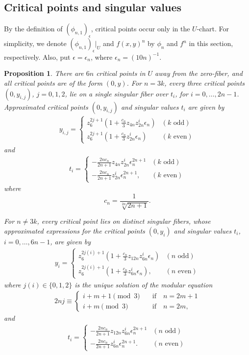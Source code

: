 \documentclass[10pt,a4paper,reqno]{amsart}
\newtheorem{prop}[thm]{Proposition}
\theoremstyle{definition}
\numberwithin{equation}{section}
\numberwithin{figure}{section}
\newcommand{\ep}{\epsilon}
\begin{document}
\subsection{Critical points and singular values} \label{sec:crit,sing}
By the definition of $(\phi_{n,1})_{\ep}$, critical points occur only in the $U$-chart.
For simplicity, we denote $(\phi_{n,1})_{\ep} |_U$ and $f(x,y)^n$ by $\phi_n$ and $f^n$ in this section, respectively.
Also, put $\ep=\ep_n$, where $\ep_n=(10n)^{-1}$.		 
\begin{prop}
There are $6n$ critical points in $U$ away from the zero-fiber, and all critical points are of the form $(0,y)$.
For $n=3k$, every three critical points $(0,y_{i,j})$, $j=0,1,2$, lie on a single singular fiber over $t_i$, for $i=0,\dots, 2n-1$.
Approximated critical points $(0,y_{i,j})$ and singular values $t_i$ are given by
\begin{align}\label{eq:y_i,j, 1}
y_{i,j}=
\begin{cases} z_6^{2j+1} (1+\frac{c_n}{3} z_{4n} z_{2n}^i {\ep_n}) & (k \text{ odd}) \\ 
z_6^{2j+1} (1+\frac{c_n}{3} z_{2n}^i {\ep_n}) & (k \text{ even})
\end{cases}
\end{align}
and
\begin{align} \label{eq:t_i, 1}
t_{i}=
\begin{cases} - \frac{2nc_n}{2n+1}  z_{4n}z_{2n}^i {\ep_n^{2n+1}} & (k \text{ odd})\\  
-\frac{2nc_n}{2n+1}  z_{2n}^i {\ep_n^{2n+1}}, & (k \text{ even})
\end{cases} 
\end{align}
where \[c_n=\frac1{\sqrt[2n]{2n+1}}.\]

For $n \neq 3k$, every critical point lies on distinct singular fibers, whose approximated expressions for the critical points
$(0,y_i)$ and singular values $t_i$, $i=0,\dots, 6n-1$, are given by
\begin{align}
y_i=
\begin{cases}
z_6^{2j(i)+1}(1+\frac{c_n}{3} z_{12n} z_{6n}^i \ep_n )& (n \text{ odd}) \\
z_6^{2j(i)+1}(1+\frac{c_n}{3} z_{6n}^i \ep_n), & (n \text{ even}) 
\end{cases}
\end{align}
where $j(i)\in\{0,1,2\}$ is the unique solution of the modular equation
\begin{align} 
2nj \equiv \begin{cases} i+m+1 \pmod 3 & \quad \text{if}  \quad n=2m+1\\
 i+m \pmod 3 & \quad \text{if}  \quad n=2m, \end{cases}
\end{align}
and
\begin{align}\label{eq:t_i, 2}
t_{i}=\begin{cases} - \frac{2nc_n}{2n+1}  z_{12n}z_{6n}^i {\ep_n^{2n+1}} & (n \text{ odd})\\ 
 -\frac{2nc_n}{2n+1}  z_{6n}^i {\ep_n^{2n+1}}. & (n \text{ even})\end{cases}
\end{align}
\end{prop}
\end{document}
